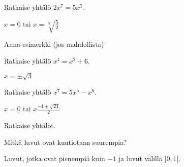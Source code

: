 \begin{multicols}{2}

\begin{tehtava} 
Ratkaise yhtälö $2x^7=5x^2$.
    \begin{vastaus}
		$x=0$ tai $x=\sqrt[5]{\frac{5}{2}}$
    \end{vastaus}
\end{tehtava}

\begin{tehtava} 
Anna esimerkki (jos mahdollista)
    \begin{vastaus}
    \end{vastaus}
\end{tehtava}

\begin{tehtava} 
Ratkaise yhtälö $x^4=x^2+6$.
    \begin{vastaus}
		$x=\pm \sqrt{3}$
    \end{vastaus}
\end{tehtava}

\begin{tehtava} 
Ratkaise yhtälö
$x^7=5x^5-x^6$.
     \begin{vastaus}
		$x=0$ tai $x\frac{-1 \pm \sqrt{21}}{2}$ 
    \end{vastaus}
\end{tehtava}

\begin{tehtava}
    Ratkaise yhtälöt.
    \begin{vastaus}
    \end{vastaus}
\end{tehtava}

\begin{tehtava}
Mitkä luvut ovat kuutiotaan suurempia?
    \begin{vastaus}
	Luvut, jotka ovat pienempiä kuin $-1$ ja luvut välillä $]0,1[$.
    \end{vastaus}
\end{tehtava}


\end{multicols}
